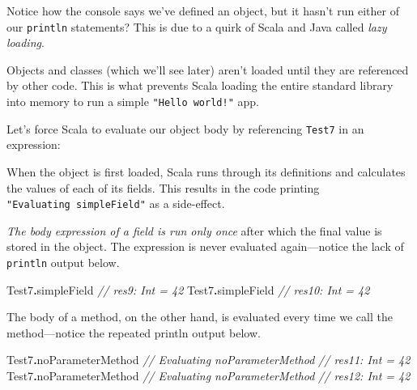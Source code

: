 \documentclass[11pt,a5paper,]{book}
\newenvironment{Shaded}{\begin{snugshade}}{\end{snugshade}}
\newcommand{\CommentTok}[1]{\textcolor[rgb]{0.56,0.35,0.01}{\textit{#1}}}
\newcommand{\NormalTok}[1]{#1}
\newcommand{\OperatorTok}[1]{\textcolor[rgb]{0.81,0.36,0.00}{\textbf{#1}}}
\begin{document}
Notice how the console says we've defined an object, but it hasn't run
either of our \texttt{println} statements? This is due to a quirk of
Scala and Java called \emph{lazy loading}.

Objects and classes (which we'll see later) aren't loaded until they are
referenced by other code. This is what prevents Scala loading the entire
standard library into memory to run a simple \texttt{"Hello\ world!"}
app.

Let's force Scala to evaluate our object body by referencing
\texttt{Test7} in an expression:

\begin{Shaded}
\end{Shaded}

When the object is first loaded, Scala runs through its definitions and
calculates the values of each of its fields. This results in the code
printing \texttt{"Evaluating\ simpleField"} as a side-effect.

\emph{The body expression of a field is run only once} after which the
final value is stored in the object. The expression is never evaluated
again---notice the lack of \texttt{println} output below.

\begin{Shaded}
\begin{Highlighting}[]
\NormalTok{Test7}\OperatorTok{.}\NormalTok{simpleField}
\CommentTok{// res9: Int = 42}
\NormalTok{Test7}\OperatorTok{.}\NormalTok{simpleField}
\CommentTok{// res10: Int = 42}
\end{Highlighting}
\end{Shaded}

The body of a method, on the other hand, is evaluated every time we call
the method---notice the repeated println output below.

\begin{Shaded}
\begin{Highlighting}[]
\NormalTok{Test7}\OperatorTok{.}\NormalTok{noParameterMethod}
\CommentTok{// Evaluating noParameterMethod}
\CommentTok{// res11: Int = 42}
\NormalTok{Test7}\OperatorTok{.}\NormalTok{noParameterMethod}
\CommentTok{// Evaluating noParameterMethod}
\CommentTok{// res12: Int = 42}
\end{Highlighting}
\end{Shaded}
\end{document}

